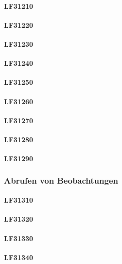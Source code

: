 \documentclass[a4paper,11pt]{article}             %
\begin{document}
			\paragraph{LF31210}
			\paragraph{LF31220}
			\paragraph{LF31230}
			\paragraph{LF31240}
			\paragraph{LF31250}
			\paragraph{LF31260}
			\paragraph{LF31270}
			\paragraph{LF31280}
			\paragraph{LF31290}
			
		\subsubsection{Abrufen von Beobachtungen}
			\paragraph{LF31310}
			\paragraph{LF31320}
			\paragraph{LF31330}
			\paragraph{LF31340}
\end{document}
